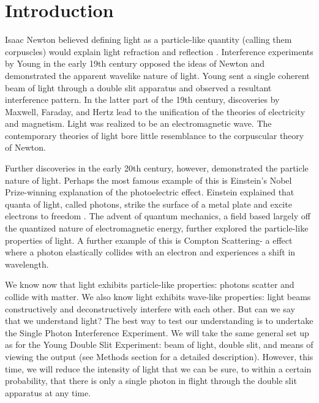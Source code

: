 \documentclass[prb,preprint]{revtex4-1}
\begin{document}
\maketitle %


\section{Introduction} %

Isaac Newton believed defining light as a particle-like quantity (calling them corpuscles) would explain light refraction and reflection \cite{newton}.  Interference experiments by Young in the early 19th century opposed the ideas of Newton and demonstrated the apparent wavelike nature of light. Young sent a single coherent beam of light through a double slit apparatus and observed a resultant interference pattern. In the latter part of the 19th century, discoveries by Maxwell, Faraday, and Hertz lead to the unification of the theories of electricity and magnetism.  Light was realized to be an electromagnetic wave.  The contemporary theories of light bore little resemblance to the corpuscular theory of Newton.  \cite{david}

Further discoveries in the early 20th century, however, demonstrated the particle nature of light.  Perhaps the most famous example of this is Einstein's Nobel Prize-winning explanation of the photoelectric effect.  Einstein explained that quanta of light, called photons, strike the surface of a metal plate and excite electrons to freedom \cite{modern}.  The advent of quantum mechanics, a field based largely off the quantized nature of electromagnetic energy, further explored the particle-like properties of light.  A further example of this is Compton Scattering- a effect where a photon elastically collides with an electron and experiences a shift in wavelength.  

We know now that light exhibits particle-like properties: photons scatter and collide with matter.  We also know light exhibits wave-like properties: light beams constructively and deconstructively interfere with each other.  But can we say that we understand light?  The best way to test our understanding is to undertake the Single Photon Interference Experiment.  We will take the same general set up as for the Young Double Slit Experiment:  beam of light, double slit, and means of viewing the output (see Methods section for a detailed description).  However, this time, we will reduce the intensity of light that we can be sure, to within a certain probability, that there is only a single photon in flight through the double slit apparatus at any time. \cite{teachspin}
\end{document}
